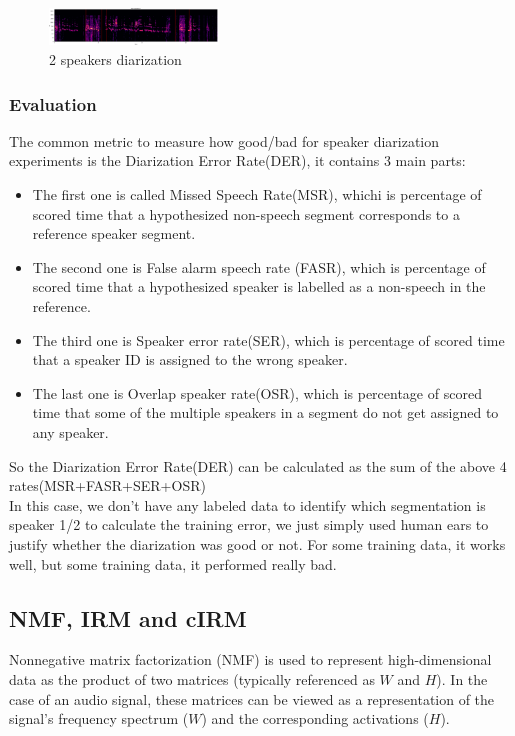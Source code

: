\documentclass[journal, a4paper]{IEEEtran}
\begin{document}
\begin{figure}[h!]
    \centering  
     \caption{\label{Fig:speaker diarization 2}2 speakers diarization}  
    \includegraphics[width=0.4\textwidth]{kmeans02.png}
\end{figure}
\subsubsection{Evaluation\cite{Segmentation}}The common metric to measure how good/bad for speaker diarization experiments is the Diarization Error Rate(DER), it contains 3 main parts:
\begin{itemize}
    \item The first one is called Missed Speech Rate(MSR), whichi is percentage of scored time that a hypothesized non-speech segment corresponds to a reference speaker segment.
    \item The second one is False alarm speech rate (FASR), which is percentage of scored time that a hypothesized speaker is labelled as a non-speech in the reference.
    \item The third one is Speaker error rate(SER), which is percentage of scored time that a speaker ID is assigned to the wrong speaker.
    \item The last one is Overlap speaker rate(OSR), which is percentage of scored time that some of the multiple speakers in a segment do not get assigned to any speaker.
\end{itemize}

So the Diarization Error Rate(DER) can be calculated as the sum of the above 4 rates(MSR+FASR+SER+OSR)\\
In this case, we don't have any labeled data to identify which segmentation is speaker 1/2 to calculate the training error, we just simply used human ears to justify whether the diarization was good or not. For some training data, it works well, but some training data, it performed really bad. 

\subsection{NMF, IRM and cIRM}
Nonnegative matrix factorization (NMF) is used to represent high-dimensional data as the product of two matrices (typically referenced as $W$ and $H$). In the case of an audio signal, these matrices can be viewed as a representation of the signal's frequency spectrum ($W$) and the corresponding activations ($H$).
\end{document}
